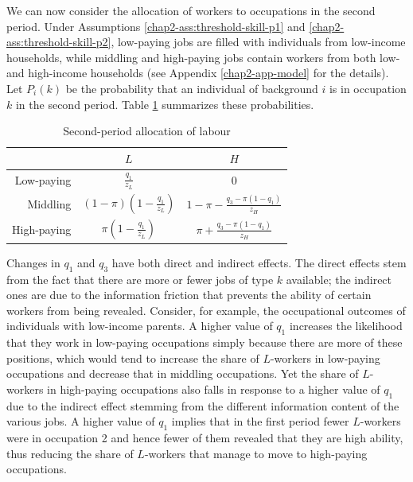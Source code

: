We can now consider the allocation of workers to occupations in the second period. Under Assumptions \ref{chap2-ass:threshold-skill-p1} and \ref{chap2-ass:threshold-skill-p2}, low-paying jobs are filled with individuals from low-income households, while middling and high-paying jobs contain workers from both low- and high-income households (see Appendix \ref{chap2-app-model} for the details). Let $P_i(k)$ be the probability that an individual of background $i$ is in occupation $k$ in the second period. 
Table \ref{chap2-tab:uncond-prb-p2} summarizes these probabilities.
\begin{table}[!htb]
    \centering
    \caption{Second-period allocation of labour}
    \label{chap2-tab:uncond-prb-p2}
    \begin{threeparttable}
        \setlength{\tabcolsep}{12pt}
        \setlength{\extrarowheight}{6pt}
        \begin{tabular}{r|c|c}
                        & $L$ & $H$ \\
            \midrule
            Low-paying  & $\frac{q_{1}}{z_{L}}$ & $0$ \\
            Middling    & $(1-\pi)\left(1-\frac{q_1}{z_L}\right) $ & $1- \pi - \frac{q_{3}-\pi (1-q_{1})}{z_{H}}$ \\
            High-paying & $\pi \left(1-\frac{q_1}{z_L}\right)$ & $\pi +\frac{q_{3}-\pi (1-q_{1})}{z_{H}}$
        \end{tabular}
    \end{threeparttable}
\end{table}

Changes in $q_{1}$ and $q_{3}$ have both direct and indirect effects. The direct effects stem from the fact that there are more or fewer jobs of type $k$ available; the indirect ones are due to the information friction that prevents the ability of certain workers from being revealed. Consider, for example, the occupational outcomes of individuals with low-income parents. A higher value of $q_1$ increases the likelihood that they work in low-paying occupations simply because there are more of these positions, which would tend to increase the share of $L$-workers in low-paying occupations and decrease that in middling occupations. Yet the share of $L$-workers in high-paying occupations also falls in response  to a higher value of $q_{1}$ due to the indirect effect stemming from the different information content of the various jobs. A higher value of $q_{1}$ implies that in the first period fewer $L$-workers were in occupation 2 and hence fewer of them revealed that they are high ability, thus reducing the share of $L$-workers that manage to move to high-paying occupations.

